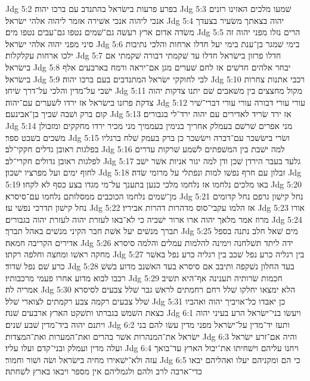 Jdg 5:2  בפרע פרעות בישׂראל בהתנדב עם ברכו יהוה׃
Jdg 5:3  שׁמעו מלכים האזינו רזנים אנכי ליהוה אנכי אשׁירה אזמר ליהוה אלהי ישׂראל׃
Jdg 5:4  יהוה בצאתך משׂעיר בצעדך משׂדה אדום ארץ רעשׁה גם־שׁמים נטפו גם־עבים נטפו מים׃
Jdg 5:5  הרים נזלו מפני יהוה זה סיני מפני יהוה אלהי ישׂראל׃
Jdg 5:6  בימי שׁמגר בן־ענת בימי יעל חדלו ארחות והלכי נתיבות ילכו ארחות עקלקלות׃
Jdg 5:7  חדלו פרזון בישׂראל חדלו עד שׁקמתי דבורה שׁקמתי אם בישׂראל׃
Jdg 5:8  יבחר אלהים חדשׁים אז לחם שׁערים מגן אם־יראה ורמח בארבעים אלף בישׂראל׃
Jdg 5:9  לבי לחוקקי ישׂראל המתנדבים בעם ברכו יהוה׃
Jdg 5:10  רכבי אתנות צחרות ישׁבי על־מדין והלכי על־דרך שׂיחו׃
Jdg 5:11  מקול מחצצים בין משׁאבים שׁם יתנו צדקות יהוה צדקת פרזנו בישׂראל אז ירדו לשׁערים עם־יהוה׃
Jdg 5:12  עורי עורי דבורה עורי עורי דברי־שׁיר קום ברק ושׁבה שׁביך בן־אבינעם׃
Jdg 5:13  אז ירד שׂריד לאדירים עם יהוה ירד־לי בגבורים׃
Jdg 5:14  מני אפרים שׁרשׁם בעמלק אחריך בנימין בעממיך מני מכיר ירדו מחקקים ומזבולן משׁכים בשׁבט ספר׃
Jdg 5:15  ושׂרי בישׂשכר עם־דברה וישׂשכר כן ברק בעמק שׁלח ברגליו בפלגות ראובן גדלים חקקי־לב׃
Jdg 5:16  למה ישׁבת בין המשׁפתים לשׁמע שׁרקות עדרים לפלגות ראובן גדולים חקרי־לב׃
Jdg 5:17  גלעד בעבר הירדן שׁכן ודן למה יגור אניות אשׁר ישׁב לחוף ימים ועל מפרציו ישׁכון׃
Jdg 5:18  זבלון עם חרף נפשׁו למות ונפתלי על מרומי שׂדה׃
Jdg 5:19  באו מלכים נלחמו אז נלחמו מלכי כנען בתענך על־מי מגדו בצע כסף לא לקחו׃
Jdg 5:20  מן־שׁמים נלחמו הכוכבים ממסלותם נלחמו עם־סיסרא׃
Jdg 5:21  נחל קישׁון גרפם נחל קדומים נחל קישׁון תדרכי נפשׁי עז׃
Jdg 5:22  אז הלמו עקבי־סוס מדהרות דהרות אביריו׃
Jdg 5:23  אורו מרוז אמר מלאך יהוה ארו ארור ישׁביה כי לא־באו לעזרת יהוה לעזרת יהוה בגבורים׃
Jdg 5:24  תברך מנשׁים יעל אשׁת חבר הקיני מנשׁים באהל תברך׃
Jdg 5:25  מים שׁאל חלב נתנה בספל אדירים הקריבה חמאה׃
Jdg 5:26  ידה ליתד תשׁלחנה וימינה להלמות עמלים והלמה סיסרא מחקה ראשׁו ומחצה וחלפה רקתו׃
Jdg 5:27  בין רגליה כרע נפל שׁכב בין רגליה כרע נפל באשׁר כרע שׁם נפל שׁדוד׃
Jdg 5:28  בעד החלון נשׁקפה ותיבב אם סיסרא בעד האשׁנב מדוע בשׁשׁ רכבו לבוא מדוע אחרו פעמי מרכבותיו׃
Jdg 5:29  חכמות שׂרותיה תענינה אף־היא תשׁיב אמריה לה׃
Jdg 5:30  הלא ימצאו יחלקו שׁלל רחם רחמתים לראשׁ גבר שׁלל צבעים לסיסרא שׁלל צבעים רקמה צבע רקמתים לצוארי שׁלל׃
Jdg 5:31  כן יאבדו כל־אויביך יהוה ואהביו כצאת השׁמשׁ בגברתו ותשׁקט הארץ ארבעים שׁנה׃
Jdg 6:1  ויעשׂו בני־ישׂראל הרע בעיני יהוה ויתנם יהוה ביד־מדין שׁבע שׁנים׃
Jdg 6:2  ותעז יד־מדין על־ישׂראל מפני מדין עשׂו להם בני ישׂראל את־המנהרות אשׁר בהרים ואת־המערות ואת־המצדות׃
Jdg 6:3  והיה אם־זרע ישׂראל ועלה מדין ועמלק ובני־קדם ועלו עליו׃
Jdg 6:4  ויחנו עליהם וישׁחיתו את־יבול הארץ עד־בואך עזה ולא־ישׁאירו מחיה בישׂראל ושׂה ושׁור וחמור׃
Jdg 6:5  כי הם ומקניהם יעלו ואהליהם יבאו כדי־ארבה לרב ולהם ולגמליהם אין מספר ויבאו בארץ לשׁחתה׃
